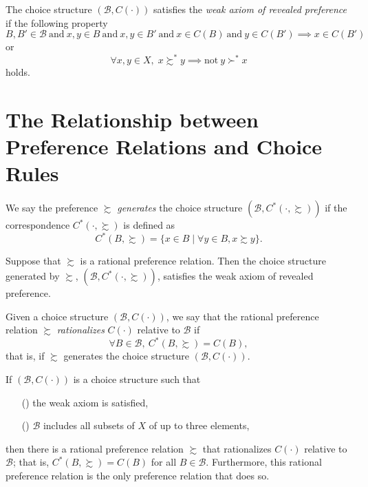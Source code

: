 \documentclass[11pt,fleqn]{book} %
\begin{document}
\begin{definition}
	The choice structure $(\mathcal{B},C(\cdot))$ satisfies the \emph{weak axiom of revealed preference} if the following property
	\[
	B,B'\in \mathcal{B}\ \text{and}\ x,y\in B\ \text{and}\ x,y\in B'\ \text{and}\ x\in C(B)\ \text{and}\ y\in C(B')\implies x\in C(B')
	\]
	or
	\[
	\forall x,y\in X,\;x\succsim^*y\implies\text{not}\ y\succ^*x
	\]
	holds.
\end{definition}

\section{The Relationship between Preference Relations and Choice Rules }

\begin{definition}
	We say the preference $\succsim$ \emph{generates} the choice structure $(\mathcal{B},C^*(\cdot,\succsim))$ if the correspondence $C^*(\cdot,\succsim)$ is defined as 
	\[
	C^*(B,\succsim)=\{x\in B\;|\;\forall y\in B, x\succsim y\}.
	\]
\end{definition}

\begin{proposition}
	Suppose that $\succsim$ is a rational preference relation. Then the choice structure generated by $\succsim$, $(\mathcal{B},C^*(\cdot,\succsim))$, satisfies the weak axiom of revealed preference. 
\end{proposition}

\begin{definition}
	Given a choice structure $(\mathcal{B},C(\cdot))$, we say that the rational preference	relation $\succsim$ \emph{rationalizes} $C(\cdot)$ relative to $\mathcal{B}$ if
	\[
	\forall B\in\mathcal{B},\ C^*(B,\succsim)=C(B),
	\]
	that is, if $\succsim$ generates the choice structure  $(\mathcal{B},C(\cdot))$.
\end{definition}

\begin{proposition}
	If $(\mathcal{B},C(\cdot))$ is a choice structure such that
	\begin{enumerate}
		\item[(\romannumeral1)] the  weak axiom is satisfied,
		\item[(\romannumeral2)] $\mathcal{B}$ includes all subsets of $X$ of up to three elements,
	\end{enumerate}
	then there is a rational preference relation $\succsim$ that rationalizes $C(\cdot)$ relative to $\mathcal{B}$; that is, $C^*(B,\succsim)=C(B)$ for all $B\in\mathcal{B}$. Furthermore, this rational preference relation is the only preference relation that does so.
\end{proposition}
\end{document}
